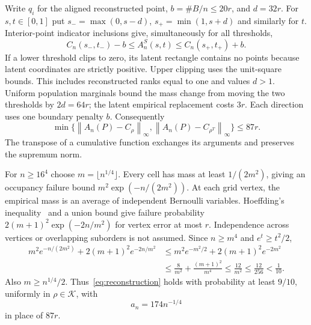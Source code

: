\documentclass[11pt]{article}
\theoremstyle{remark}
\newcommand{\K}{\mathcal K}
\newcommand{\norm}[1]{\left\lVert #1\right\rVert_\infty}
\begin{document}
Write $q_i$ for the aligned reconstructed point, $b=\#B/n\le20r$,
and $d=32r$. For $s,t\in[0,1]$ put
$s_- =\max(0,s-d)$, $s_+=\min(1,s+d)$ and similarly for $t$.
Interior-point indicator inclusions give, simultaneously for all thresholds,
\[
 C_n(s_-,t_-)-b\le A_n^S(s,t)\le C_n(s_+,t_+)+b.
\]
If a lower threshold clips to zero, its latent rectangle contains no
points because latent coordinates are strictly positive. Upper clipping
uses the unit-square bounds. This includes reconstructed ranks equal
to one and values $d>1$. Uniform population marginals bound the mass
change from moving the two thresholds by $2d=64r$; the latent empirical
replacement costs $3r$. Each direction uses one boundary penalty $b$.
Consequently
\begin{equation}\label{eq:reconstruction}
 \min\{\norm{A_n(P)-C_\rho},\norm{A_n(P)-C_{\rho^T}}\}\le87r.
\end{equation}
The transpose of a cumulative function exchanges its arguments and
preserves the supremum norm.

For $n\ge16^4$ choose $m=\lfloor n^{1/4}\rfloor$. Every cell has
mass at least $1/(2m^2)$, giving an occupancy failure bound
$m^2\exp(-n/(2m^2))$. At each grid vertex, the empirical mass is an
average of independent Bernoulli variables. Hoeffding's
inequality~\cite{Hoeffding} and a union bound give failure probability
$2(m+1)^2\exp(-2n/m^2)$ for vertex error at most $r$.
Independence across vertices or overlapping suborders is not assumed.
Since $n\ge m^4$ and $e^t\ge t^2/2$,
\begin{align*}
 m^2e^{-n/(2m^2)}+2(m+1)^2e^{-2n/m^2}
 &\le m^2e^{-m^2/2}+2(m+1)^2e^{-2m^2}\\
 &\le\frac8{m^2}+\frac{(m+1)^2}{m^4}
 \le\frac{12}{m^2}\le\frac{12}{256}<\frac1{10}.
\end{align*}
Also $m\ge n^{1/4}/2$. Thus~\eqref{eq:reconstruction} holds with
probability at least $9/10$, uniformly in $\rho\in\K$, with
\begin{equation}\label{eq:an}
 a_n=174n^{-1/4}
\end{equation}
in place of $87r$.
\end{document}
